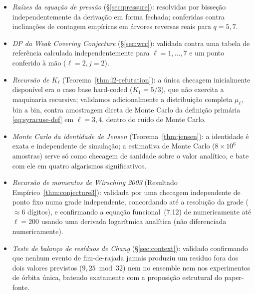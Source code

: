 \documentclass[11pt]{article}
\theoremstyle{definition}
\theoremstyle{remark}
\begin{document}
\begin{itemize}
\item \emph{Raízes da equação de pressão} (\S\ref{sec:pressure}):
  resolvidas por bisseção independentemente da derivação em forma
  fechada; conferidas contra inclinações de contagem empíricas em
  árvores reversas reais para $q=5,7$.
\item \emph{DP da Weak Covering Conjecture} (\S\ref{sec:wcc}):
  validada contra uma tabela de referência calculada
  independentemente para $\ell=1,\dots,7$ e um ponto conferido à mão
  ($\ell=2,j=2$).
\item \emph{Recursão de $K_\ell$} (Teorema~\ref{thm:l2-refutation}): a
  única checagem inicialmente disponível era o caso base hard-coded
  ($K_1=5/3$), que não exercita a maquinaria recursiva; validamos
  adicionalmente a distribuição completa $\mu_\ell$, bin a bin, contra
  amostragem direta de Monte Carlo da definição primária
  \eqref{eq:syracuse-def} em $\ell=3,4$, dentro do ruído de Monte
  Carlo.
\item \emph{Monte Carlo da identidade de Jensen} (Teorema~\ref{thm:jensen}):
  a identidade é exata e independente de simulação; a estimativa de
  Monte Carlo ($8\times10^6$ amostras) serve só como checagem de
  sanidade sobre o valor analítico, e bate com ele em quatro
  algarismos significativos.
\item \emph{Recursão de momentos de Wirsching 2003}
  (Resultado Empírico~\ref{thm:conjecture3}): validada por uma checagem
  independente de ponto fixo numa grade independente, concordando até
  a resolução da grade ($\approx 6$ dígitos), e confirmando a equação
  funcional~(7.12) de \cite{Wirsching2003} numericamente até
  $\ell=200$ usando uma derivada logarítmica analítica (não
  diferenciada numericamente).
\item \emph{Teste de balanço de resíduos de Chang} (\S\ref{sec:context}):
  validado confirmando que nenhum evento de fim-de-rajada jamais
  produziu um resíduo fora dos dois valores previstos ($9,25\bmod32$)
  nem no ensemble nem nos experimentos de órbita única, batendo
  exatamente com a proposição estrutural do paper-fonte.
\end{itemize}
\end{document}
